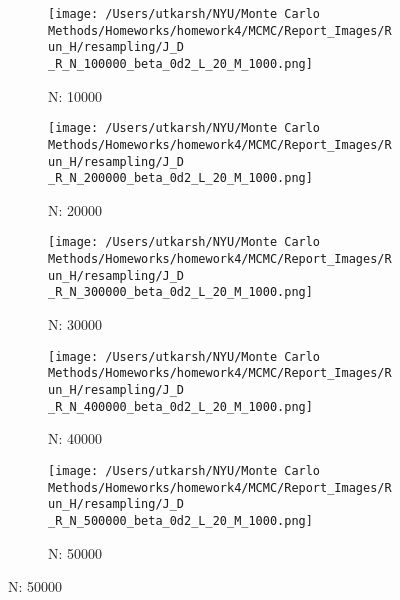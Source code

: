 \documentclass[11pt]{article}
\begin{document}
\begin{figure}[H]
	\centering
	\begin{subfigure}{.18\textwidth}
		\texttt{[image: /Users/utkarsh/NYU/Monte Carlo Methods/Homeworks/homework4/MCMC/Report\_Images/Run\_H/resampling/J\_D \_R\_N\_100000\_beta\_0d2\_L\_20\_M\_1000.png]}
		\caption{N: 10000}
	\end{subfigure}
	\begin{subfigure}{.18\textwidth}
		\texttt{[image: /Users/utkarsh/NYU/Monte Carlo Methods/Homeworks/homework4/MCMC/Report\_Images/Run\_H/resampling/J\_D \_R\_N\_200000\_beta\_0d2\_L\_20\_M\_1000.png]}
		\caption{N: 20000}
	\end{subfigure}
	\begin{subfigure}{.18\textwidth}
		\texttt{[image: /Users/utkarsh/NYU/Monte Carlo Methods/Homeworks/homework4/MCMC/Report\_Images/Run\_H/resampling/J\_D \_R\_N\_300000\_beta\_0d2\_L\_20\_M\_1000.png]}
		\caption{N: 30000}
	\end{subfigure}	
	\begin{subfigure}{.18\textwidth}
		\texttt{[image: /Users/utkarsh/NYU/Monte Carlo Methods/Homeworks/homework4/MCMC/Report\_Images/Run\_H/resampling/J\_D \_R\_N\_400000\_beta\_0d2\_L\_20\_M\_1000.png]}
		\caption{N: 40000}
	\end{subfigure}	
	\begin{subfigure}{.18\textwidth}
		\texttt{[image: /Users/utkarsh/NYU/Monte Carlo Methods/Homeworks/homework4/MCMC/Report\_Images/Run\_H/resampling/J\_D \_R\_N\_500000\_beta\_0d2\_L\_20\_M\_1000.png]}
		\caption{N: 50000}
	\end{subfigure}	


\end{figure}
\end{document}
